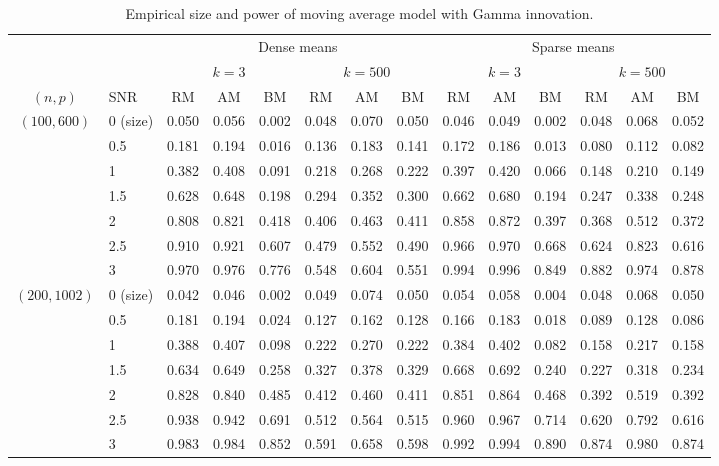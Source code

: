 \documentclass[3p]{elsarticle}
\theoremstyle{plain}
\theoremstyle{definition}
\theoremstyle{remark}
\begin{document}
\begin{table}[ht]
    \caption{Empirical size and power of moving average model with Gamma innovation. }
\label{table2}
\footnotesize
    \centering
    \begin{tabular}{clcccccccccccc}
          \toprule
          & & \multicolumn{6}{c}{Dense means} &\multicolumn{6}{c}{Sparse means}\\
          \cmidrule(r){3-8}\cmidrule(r){9-14}
          & & \multicolumn{3}{c}{$k=3$} & \multicolumn{3}{c}{$k=500$} & \multicolumn{3}{c}{$k=3$}& \multicolumn{3}{c}{$k=500$}\\
          \cmidrule(r){3-5}  \cmidrule(r){6-8} \cmidrule(r){9-11}  \cmidrule(r){12-14}
           $(n,p)$&SNR & RM & AM & BM & RM & AM & BM & RM & AM & BM & RM & AM & BM  \\ 
            \midrule
$(100,600)$ &0 (size) & 0.050 & 0.056 & 0.002 & 0.048 & 0.070 & 0.050 & 0.046 & 0.049 & 0.002 & 0.048 & 0.068 & 0.052 \\ 
&0.5 & 0.181 & 0.194 & 0.016 & 0.136 & 0.183 & 0.141 & 0.172 & 0.186 & 0.013 & 0.080 & 0.112 & 0.082 \\ 
&1 & 0.382 & 0.408 & 0.091 & 0.218 & 0.268 & 0.222 & 0.397 & 0.420 & 0.066 & 0.148 & 0.210 & 0.149 \\ 
&1.5 & 0.628 & 0.648 & 0.198 & 0.294 & 0.352 & 0.300 & 0.662 & 0.680 & 0.194 & 0.247 & 0.338 & 0.248 \\ 
&2 & 0.808 & 0.821 & 0.418 & 0.406 & 0.463 & 0.411 & 0.858 & 0.872 & 0.397 & 0.368 & 0.512 & 0.372 \\ 
&2.5 & 0.910 & 0.921 & 0.607 & 0.479 & 0.552 & 0.490 & 0.966 & 0.970 & 0.668 & 0.624 & 0.823 & 0.616 \\ 
&3 & 0.970 & 0.976 & 0.776 & 0.548 & 0.604 & 0.551 & 0.994 & 0.996 & 0.849 & 0.882 & 0.974 & 0.878 \\ 
        \midrule
$(200,1002)$ &0 (size) & 0.042 & 0.046 & 0.002 & 0.049 & 0.074 & 0.050 & 0.054 & 0.058 & 0.004 & 0.048 & 0.068 & 0.050 \\
&0.5 & 0.181 & 0.194 & 0.024 & 0.127 & 0.162 & 0.128 & 0.166 & 0.183 & 0.018 & 0.089 & 0.128 & 0.086 \\
&1 & 0.388 & 0.407 & 0.098 & 0.222 & 0.270 & 0.222 & 0.384 & 0.402 & 0.082 & 0.158 & 0.217 & 0.158 \\
&1.5 & 0.634 & 0.649 & 0.258 & 0.327 & 0.378 & 0.329 & 0.668 & 0.692 & 0.240 & 0.227 & 0.318 & 0.234 \\
&2 & 0.828 & 0.840 & 0.485 & 0.412 & 0.460 & 0.411 & 0.851 & 0.864 & 0.468 & 0.392 & 0.519 & 0.392 \\
&2.5 & 0.938 & 0.942 & 0.691 & 0.512 & 0.564 & 0.515 & 0.960 & 0.967 & 0.714 & 0.620 & 0.792 & 0.616 \\
&3 & 0.983 & 0.984 & 0.852 & 0.591 & 0.658 & 0.598 & 0.992 & 0.994 & 0.890 & 0.874 & 0.980 & 0.874 \\




\end{tabular}
\end{table}
\end{document}
